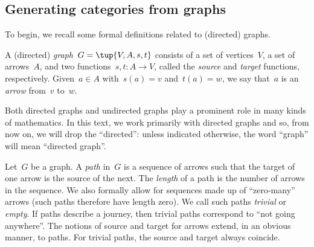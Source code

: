 %
%
%


\subsection{Generating categories from graphs}
\label{sec:catsfromgraphs}
To begin, we recall some formal definitions related to (directed) graphs. 

\begin{definition}[Graph]
A (directed) \emph{graph}~$G=\tup{V,A,s,t}$ consists of a set of vertices~$V$, a set of arrows~$A$, and two functions~$s,t\colon A\to V$, called the \emph{source} and \emph{target} functions, respectively. Given~$a\in A$ with~$s(a)=v$ and~$t(a)=w$, we say that~$a$ is an \emph{arrow} from~$v$ to~$w$. 
\end{definition}

\begin{remark}
Both directed graphs and undirected graphs play a prominent role in many kinds of mathematics. In this text, we work primarily with directed graphs and so, from now on, we will drop the ``directed'': unless indicated otherwise, the word ``graph'' will mean ``directed graph''. 
\end{remark}

\begin{definition}[Paths]
Let~$G$ be a graph. A \emph{path} in~$G$ is a sequence of arrows such that the target of one arrow is the source of the next. The \emph{length} of a path is the number of arrows in the sequence. We also formally allow for sequences made up of ``zero-many'' arrows (such paths therefore have length zero). We call such paths \emph{trivial} or \emph{empty}. If paths describe a journey, then trivial paths correspond to ``not going anywhere''.  The notions of source and target for arrows extend, in an obvious manner, to paths. For trivial paths, the source and target always coincide. 
\end{definition}

